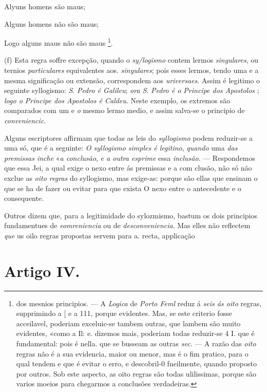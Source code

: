 Alyuns homens são maus;

Alguns homens não são maus;

Logo alguns maus não são maus \footnote{dos mesnios principios. --- A \emph{Logica} de \emph{Porto Feml} reduz á \emph{seis ás oito} regras, supprimindo a [ e a 111, porque evidentes. Mas, se este criterio fosse acceilavel, poderiam exceluic-se tambem outras, que lambem são muito evidentes, «como a Il: e. dizemos mais, poderiam todas reduzir-se 4 I. que é fundamental: pois é nella. que se busseam as outras \emph{sec}. --- A razão das \emph{oito} regras não é a sua evidencia, maior ou menor, mas é o fim pratico, para o qual tendem e que é evitar o erro, e descobril-0 fneilmente, quando proposto por outros. Sob este aspecto, as oito regras são todas ulilissimas, porque são varios moeios para chegarmos a conclusões verdadeiras.}.

(f) Esta regra soffre excepção, quando o \emph{sy/logismo} contem lermos \emph{singulares}, ou ternios \emph{particulares} equivalentes aos. \emph{sinyulares}; pois esses lermos, tendo uma e a mesma significação ou extensão, correspondem aos \emph{uriversaes}. Assim é legitimo o seguinte syllogismo: \emph{S}. \emph{Pedro é Galileu}; \emph{ora S}. \emph{Pedro é o Principe dos Apostolos} ; \emph{logo o Principe dos Apostolos é Caldeu}. Neste exemplo, os extremos são comparados com um e \emph{o} mesmo lermo medio, e assim salva-se o principio de \emph{conveniencic}.

Alguns escriptores affirmam que todas as leis do \emph{syllogismo} podem reduzir-se a uma só, que é a seguinte: \emph{O syllogismo simples é legitino}, \emph{quando} uma \emph{das premissas inche} «\emph{a conclusão}, \emph{e a outra esprime} essa \emph{inclusão}. --- Respondemos que essa Jei, a qual exige o nexo entre ás premissas e a com clusão, não só não exclue as \emph{oito regras} do syllogismo, mas exige-as: porque são ellas que ensinam o que se ha de fazer ou evitar para que exista O nexo entre o antecedente e o consequente.

Outros dizem que, para a legitimidade do sylozmismo, bastum os dois principios fundamentues de \emph{eomreniencia} ou de \emph{desconveniencia}. Mas elles não reflectem \emph{que} us oilo regras propostas servem para a. recta, applicação


\section*{Artigo IV.}


